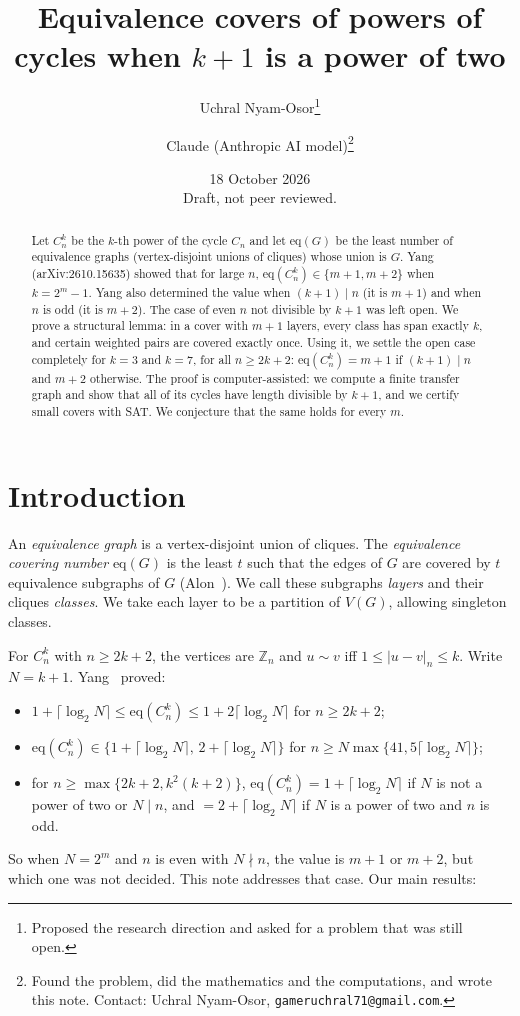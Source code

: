 \documentclass[11pt]{article}
\title{Equivalence covers of powers of cycles when $k+1$ is a power of two}
\author{Uchral Nyam-Osor\thanks{Proposed the research direction and asked for a problem that was still open.} \and Claude (Anthropic AI model)\thanks{Found the problem, did the mathematics and the computations, and wrote this note. Contact: Uchral Nyam-Osor, \texttt{gameruchral71@gmail.com}.}}
\date{18 October 2026 \\ \small Draft, not peer reviewed.}
\theoremstyle{remark}
\begin{document}
\maketitle
\begin{abstract}
Let $C_n^k$ be the $k$-th power of the cycle $C_n$ and let $\mathrm{eq}(G)$ be the least number of equivalence graphs (vertex-disjoint unions of cliques) whose union is $G$. Yang (arXiv:2610.15635) showed that for large $n$, $\mathrm{eq}(C_n^k)\in\{m+1,m+2\}$ when $k=2^m-1$. Yang also determined the value when $(k+1)\mid n$ (it is $m+1$) and when $n$ is odd (it is $m+2$). The case of even $n$ not divisible by $k+1$ was left open. We prove a structural lemma: in a cover with $m+1$ layers, every class has span exactly $k$, and certain weighted pairs are covered exactly once. Using it, we settle the open case completely for $k=3$ and $k=7$, for all $n\ge 2k+2$: $\mathrm{eq}(C_n^k)=m+1$ if $(k+1)\mid n$ and $m+2$ otherwise. The proof is computer-assisted: we compute a finite transfer graph and show that all of its cycles have length divisible by $k+1$, and we certify small covers with SAT. We conjecture that the same holds for every $m$.
\end{abstract}

\section{Introduction}
An \emph{equivalence graph} is a vertex-disjoint union of cliques. The \emph{equivalence covering number} $\mathrm{eq}(G)$ is the least $t$ such that the edges of $G$ are covered by $t$ equivalence subgraphs of $G$ (Alon~\cite{alon}). We call these subgraphs \emph{layers} and their cliques \emph{classes}. We take each layer to be a partition of $V(G)$, allowing singleton classes.

For $C_n^k$ with $n\ge 2k+2$, the vertices are $\mathbb Z_n$ and $u\sim v$ iff $1\le |u-v|_n\le k$. Write $N=k+1$. Yang~\cite{yang} proved:
\begin{itemize}
\item $1+\lceil\log_2 N\rceil\le \mathrm{eq}(C_n^k)\le 1+2\lceil\log_2 N\rceil$ for $n\ge 2k+2$;
\item $\mathrm{eq}(C_n^k)\in\{1+\lceil\log_2N\rceil,\,2+\lceil\log_2N\rceil\}$ for $n\ge N\max\{41,5\lceil\log_2N\rceil\}$;
\item for $n\ge\max\{2k+2,k^2(k+2)\}$, $\mathrm{eq}(C_n^k)=1+\lceil\log_2 N\rceil$ if $N$ is not a power of two or $N\mid n$, and $=2+\lceil\log_2N\rceil$ if $N$ is a power of two and $n$ is odd.
\end{itemize}
So when $N=2^m$ and $n$ is even with $N\nmid n$, the value is $m+1$ or $m+2$, but which one was not decided. This note addresses that case. Our main results:
\end{document}
